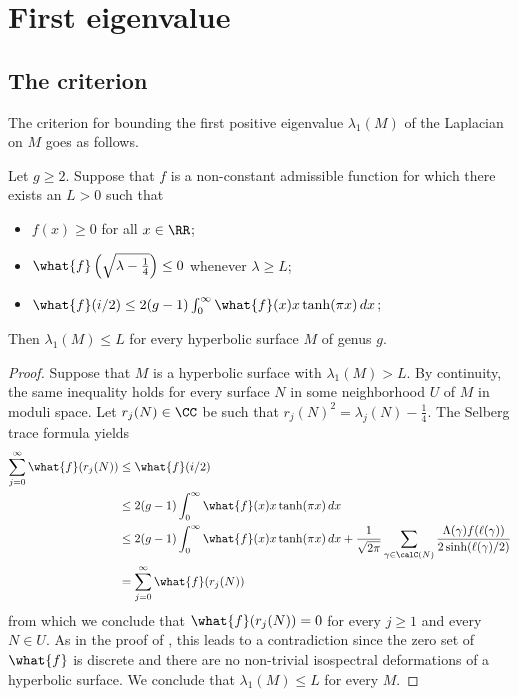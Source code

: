 \documentclass[12pt]{amsart}
\numberwithin{equation}{section}
\begin{document}
\section{First eigenvalue}

\subsection{The criterion} 
The criterion for bounding the first positive eigenvalue $\lambda_1(M)$ of the Laplacian on $M$ goes as follows.

\begin{thm} \label{thm:lambda}
Let $g \geq 2$. Suppose that $f$ is a non-constant admissible function for which there exists an $L>0$ such that
\begin{itemize}
\item $f(x) \geq 0$ for all $x\in \RR$;
\item $\what{f}\left(\sqrt{\lambda-\frac14}\right) \leq 0 $ whenever $\lambda \geq L$;
\item $\what{f}(i/2) \leq 2(g-1) \int_0^\infty \what{f}(x) x\tanh(\pi x)\,dx$;
\end{itemize}
Then $\lambda_1(M) \leq L$ for every hyperbolic surface $M$ of genus $g$.
\end{thm}

\begin{proof}
Suppose that $M$ is a hyperbolic surface with $\lambda_1(M) > L$. By continuity, the same inequality holds for every surface $N$ in some neighborhood $U$ of $M$ in moduli space. Let $r_j(N)\in \CC$ be such that $r_j(N)^2 =\lambda_j(N)-\frac14$. The Selberg trace formula yields
\begin{align*}
\sum_{j =0}^\infty \what{f}(r_j(N)) & \leq \what{f}(i/2) \\
&  \leq  2(g-1) \int_0^\infty \what{f}(x) x\tanh(\pi x)\,dx \\
 &  \leq 2(g-1) \int_0^\infty \what{f}(x) x\tanh(\pi x)\,dx + \frac{1}{\sqrt{2\pi}}\sum_{\gamma \in \calC(N)} \frac{\Lambda(\gamma)f(\ell(\gamma))}{2 \sinh(\ell(\gamma)/2)}  \\
& = \sum_{j =0}^\infty \what{f}(r_j(N))
\end{align*}
from which we conclude that $\what{f}(r_j(N))=0$ for every $j\geq 1$ and every $N\in U$. As in the proof of , this leads to a contradiction since the zero set of $\what{f}$ is discrete and there are no non-trivial isospectral deformations of a hyperbolic surface. We conclude that $\lambda_1(M) \leq L$ for every $M$.
\end{proof}
\end{document}
